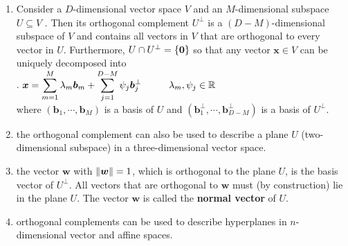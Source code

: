 \begin{enumerate}
    \item Consider a $D$-dimensional vector space $V$ and an $M$-dimensional subspace $U \subseteq V$ . 
    Then its orthogonal complement $U^\perp$ is a $(D-M)$-dimensional subspace of $V$ and contains all vectors in $V$ that are orthogonal to every vector in $U$. 
    Furthermore, $U \cap U^\perp = \left\{\bm{0}\right\}$ so that any vector $\bm{x} \in V$ can be uniquely decomposed into
    \hfill \cite{mfml/book/mml/Deisenroth-Faisal-Ong}
    \\
    .\hfill
    $
        \bm{x}
        = \displaystyle\sum^M_{m=1} \lambda_m \bm{b}_m + \displaystyle\sum ^{D-M}_{j=1} \psi_j \bm{b}_j^\perp
        \hspace{1cm}
        \lambda_m, \psi_j \in \mathbb{R}
    $
    \hfill \cite{mfml/book/mml/Deisenroth-Faisal-Ong}
    \\
    where $(\bm{b}_1, \cdots , \bm{b}_M)$ is a basis of $U$ and $(\bm{b}^\perp _1 , \cdots , \bm{b}^\perp _{D-M})$ is a basis of $U^\perp$.
    \hfill \cite{mfml/book/mml/Deisenroth-Faisal-Ong}

    \item the orthogonal complement can also be used to describe a plane $U$ (two-dimensional subspace) in a three-dimensional vector space.
    \hfill \cite{mfml/book/mml/Deisenroth-Faisal-Ong}

    \item the vector $\bm{w}$ with $\left\| \bm{w} \right\| = 1$, which is orthogonal to the plane $U$, is the basis vector of $U^\perp$.
    All vectors that are orthogonal to $\bm{w}$ must (by construction) lie in the plane $U$. 
    The vector $\bm{w}$ is called the \textbf{normal vector} of $U$.
    \hfill \cite{mfml/book/mml/Deisenroth-Faisal-Ong}

    \item orthogonal complements can be used to describe hyperplanes in $n$-dimensional vector and affine spaces.
    \hfill \cite{mfml/book/mml/Deisenroth-Faisal-Ong}
\end{enumerate}




































